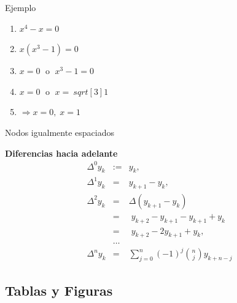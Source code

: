\documentclass[11pt,a4paper]{beamer}
\begin{document}
\begin{frame}{Ejemplo}
\begin{enumerate}
\item <1-> $x^4-x=0$
\item <4-> $x(x^3-1) =0$
\item <1-> $x =0 \;$ o $\;x^3 -1=0$
\item <3-> $x =0 \;$ o $\;x=\ sqrt [3]{1}$
\item <2-> $\Longrightarrow x=0,\; x=1$
\end{enumerate}
\end{frame}

\begin{frame}{ Nodos igualmente espaciados}
\begin{block}{ \bf \sc Diferencias hacia adelante}
\begin{eqnarray*}
\Delta^0 y_k&:=&y_k,\\ 
\Delta^1 y_k&=&y_{k+1}-y_k,\\
\Delta^2 y_k&=&\Delta(y_{k+1}-y_k)\; \\
&=&\;y_{k+2}-y_{k+1}-y_{k+1}+y_k\; \\
&=&\;y_{k+2}-2y_{k+1}+y_k,\\
&\dots &\\
\Delta^n y_k&=&\sum_{j=0}^{n}(-1)^j\binom{n}{j}y_{k+n-j}
\end{eqnarray*}
\end{block}
\end{frame}

 
 
\subsection{Tablas y Figuras} %
 
\end{document}

